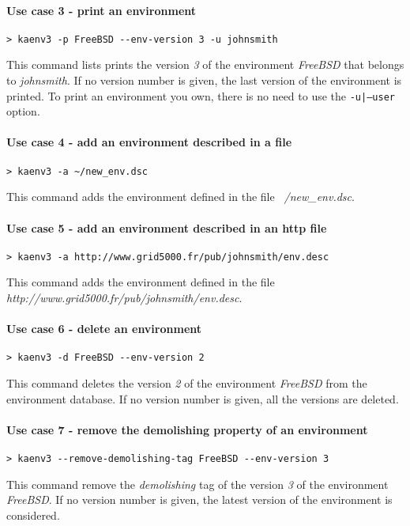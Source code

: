 \documentclass[a4wide,10pt,oneside]{book}
\begin{document}
\paragraph{Use case 3 - print an environment}
\begin{verbatim}
> kaenv3 -p FreeBSD --env-version 3 -u johnsmith
\end{verbatim}
This command lists prints the version \textit{3} of the environment \textit{FreeBSD} that belongs to \textit{johnsmith}. If no version number is given, the last version of the environment is printed. To print an environment you own, there is no need to use the \texttt{-u|--user} option.

\paragraph{Use case 4 - add an environment described in a file}
\begin{verbatim}
> kaenv3 -a ~/new_env.dsc
\end{verbatim}
This command adds the environment defined in the file \textit{~/new\_env.dsc}.

\paragraph{Use case 5 - add an environment described in an http file}
\begin{verbatim}
> kaenv3 -a http://www.grid5000.fr/pub/johnsmith/env.desc
\end{verbatim}
This command adds the environment defined in the file \textit{http://www.grid5000.fr/pub/johnsmith/env.desc}.

\paragraph{Use case 6 - delete an environment}
\begin{verbatim}
> kaenv3 -d FreeBSD --env-version 2
\end{verbatim}
This command deletes the version \textit{2} of the environment \textit{FreeBSD} from the environment database. If no version number is given, all the versions are deleted.

\paragraph{Use case 7 - remove the demolishing property of an environment}
\begin{verbatim}
> kaenv3 --remove-demolishing-tag FreeBSD --env-version 3
\end{verbatim}
This command remove the \textit{demolishing} tag of the version \textit{3} of the environment \textit{FreeBSD}. If no version number is given, the latest version of the environment is considered.
\end{document}
